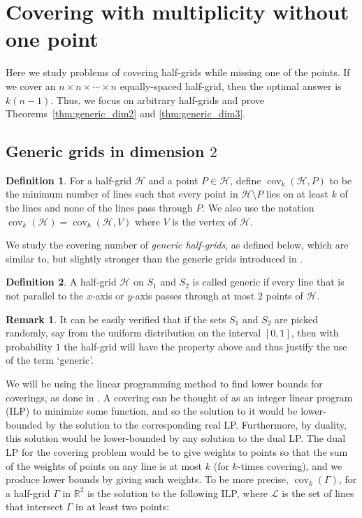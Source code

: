 \documentclass[usenames,dvipsnames, 11pt]{article}
\numberwithin{thm}{section}
\theoremstyle{definition}
\newtheorem{mydef}{Definition}
\theoremstyle{definition}
\newtheorem{rem}{Remark}
\theoremstyle{definition}
\newcommand{\cov}[1]{\operatorname{cov}_{#1}}
\newcommand{\1}{\mathbf{1}}
\def\cH{{\mathcal H}}
\begin{document}
\section{Covering with multiplicity without one point}
\label{sec:missing_point}


Here we study problems of covering half-grids while missing one of the points.
If we cover an $n \times n \times \cdots \times n$ equally-spaced half-grid, then the optimal answer is $k(n-1)$. 
Thus, we focus on arbitrary half-grids and prove Theorems~\ref{thm:generic_dim2} and \ref{thm:generic_dim3}.


\subsection{Generic grids in dimension $2$}


\begin{mydef}
    For a half-grid $\cH$ and a point $P \in \cH$, define $\cov{k}(\cH,P)$ to be the minimum number of lines such that every point in $\cH \setminus P$ lies on at least $k$ of the lines and none of the lines pass through $P$. We also use the notation $\cov{k}(\cH)=\cov{k}(\cH,V)$ where $V$ is the vertex of $\cH$.
\end{mydef}

We study the covering number of \textit{generic half-grids}, as defined below, which are similar to, but slightly stronger than the generic grids introduced in \cite{BBDD23}. 

\begin{mydef}
    A half-grid $\cH$ on $S_1$ and $S_2$ is called generic if every line that is not parallel to the $x$-axis or $y$-axis passes through at most $2$ points of $\cH$.
\end{mydef}

\begin{rem}
    It can be easily verified that if the sets $S_1$ and $S_2$ are picked randomly, say from the uniform distribution on the interval $[0, 1]$, then with probability $1$ the half-grid will have the property above and thus justify the use of the term `generic'. 
\end{rem}


We will be using the linear programming method to find lower bounds for coverings, as done in \cite{BBDD23}. A covering can be thought of as an integer linear program (ILP) to minimize some function, and so the solution to it would be lower-bounded by the solution to the corresponding real LP. 
Furthermore, by duality, this solution would be lower-bounded by any solution to the dual LP. The dual LP for the covering problem would be to give weights to points so that the sum of the weights of points on any line is at most $k$ (for $k$-times covering), and we produce lower bounds by giving such weights.
To be more precise, 
$\cov{k}(\Gamma)$, for a half-grid $\Gamma$ in $\mathbb{R}^2$ is the solution to the following ILP, where $\mathcal{L}$ is the set of lines that intersect $\Gamma$ in at least two points:
\end{document}
